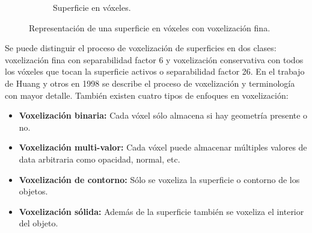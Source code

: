 \begin{figure}[H]
\begin{subfigure}{0.33\textwidth}
		\captionsetup{width=.95\textwidth}
		\caption{Superficie en vóxeles.}
	\end{subfigure}%
	\caption{Representación de una superficie en vóxeles con voxelización fina.}
	\label{fig:rigid_grid}
\end{figure}

Se puede distinguir el proceso de voxelización de superficies en dos clases: voxelización fina con separabilidad factor 6 y voxelización conservativa con todos los vóxeles que tocan la superficie activos o separabilidad factor 26. En el trabajo de Huang y otros en 1998 \cite{Huang:1998:AMV:288126.288181} se describe el proceso de voxelización y terminología con mayor detalle. También existen cuatro tipos de enfoques en voxelización:

\begin{itemize}
	\label{list:voxelization_types}
	\item \textbf{Voxelización binaria:} Cada vóxel sólo almacena si hay geometría presente o no.
	\item \textbf{Voxelización multi-valor:} Cada vóxel puede almacenar múltiples valores de data arbitraria como opacidad, normal, etc.
	\item \textbf{Voxelización de contorno:} Sólo se voxeliza la superficie o contorno de los objetos.
	\item \textbf{Voxelización sólida:} Además de la superficie también se voxeliza el interior del objeto.
\end{itemize}
